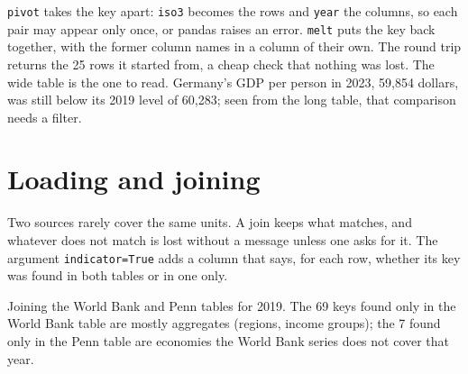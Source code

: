 \label{lst:b1:economic-data-python:long-wide}

\label{out:b1:economic-data-python:long-wide}

\texttt{pivot} takes the key apart: \texttt{iso3} becomes the rows and
\texttt{year} the columns, so each pair may appear only once, or pandas raises
an error. \texttt{melt} puts the key back together, with the former column
names in a column of their own. The round trip returns the 25 rows it
started from, a cheap check that nothing was lost. The wide table is the
one to read. Germany's GDP per person in 2023, 59,854 dollars, was still
below its 2019 level of 60,283; seen from the long table, that comparison
needs a filter.

\section{Loading and joining}\label{sec:b1:economic-data-python:joining}

Two sources rarely cover the same units. A join keeps what matches, and
whatever does not match is lost without a message unless one asks for it.
The argument \texttt{indicator=True} adds a column that says, for each row,
whether its key was found in both tables or in one only.

\begin{omfigure}

{\small Joining the World Bank and Penn tables for 2019. The 69 keys found only
in the World Bank table are mostly aggregates (regions, income groups);
the 7 found only in the Penn table are economies the World Bank series
does not cover that year.}
\end{omfigure}

